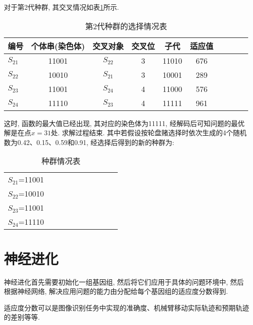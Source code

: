 对于第2代种群, 其交叉情况如表\ref{AI_table2019112810}所示.
\begin{table} [H]
\caption{第2代种群的选择情况表}
\vspace{-0.4cm}
\begin{center}
\begin{tabular} {lccccccccc}
  \hline
编号&	个体串(染色体)&	交叉对象&	交叉位&子代&适应值\\
  \hline
$S_{21}$&	11001	    &$S_{22}$	&3	&11010&	676\\
$S_{22}$&	10010	    &$S_{21}$   &3	&10001&	289\\
$S_{23}$&	11001	    &$S_{24}$	&4	&11000&	576\\
$S_{24}$&	11110	    &$S_{23}$	&4	&11111&	961\\
\hline
\end{tabular}
\end{center}
\label{AI_table2019112810}
\vspace{-0.4cm}
\end{table}
这时, 函数的最大值已经出现, 其对应的染色体为11111, 经解码后可知问题的最优解是在点$x=31$处. 求解过程结束.
其中若假设按轮盘赌选择时依次生成的4个随机数为0.42、0.15、0.59和0.91, 经选择后得到的新的种群为:
\begin{table} [H]
\caption{种群情况表}
\vspace{-0.4cm}
\begin{center}
\begin{tabular} {lccccccccc}
\hline
$S_{21}$=11001\\
$S_{22}$=10010\\
$S_{23}$=11001\\
$S_{24}$=11110\\
\hline
\end{tabular}
\end{center}
\vspace{-1.4cm}
\end{table}
\section{神经进化}
    神经进化首先需要初始化一组基因组, 然后将它们应用于具体的问题环境中, 然后根据神经网络, 解决应用问题的能力由分配给每个基因组的适应度分数得到.
\begin{newexam}
    适应度分数可以是图像识别任务中实现的准确度、机械臂移动实际轨迹和预期轨迹的差别等等.
\end{newexam}

